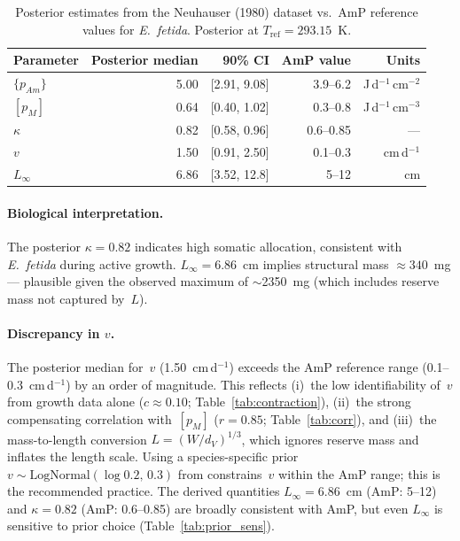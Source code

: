\documentclass[article,shortnames]{jss}
\newcommand{\pAm}{\{p_{Am}\}}
\newcommand{\pM}{[p_M]}
\begin{document}
\begin{table}[t!]
\centering
\caption{Posterior estimates from the Neuhauser (1980) dataset vs.\
  AmP reference values for \emph{E.~fetida}.  Posterior at
  $T_\mathrm{ref} = 293.15$~K.}
\label{tab:realdata}
\begin{tabular}{lrrrr}
\toprule
Parameter & Posterior median & 90\% CI & AmP value & Units \\
\midrule
$\pAm$     & 5.00 & [2.91, 9.08] & 3.9--6.2 &
  J\,d$^{-1}$\,cm$^{-2}$ \\
$\pM$      & 0.64 & [0.40, 1.02] & 0.3--0.8 &
  J\,d$^{-1}$\,cm$^{-3}$ \\
$\kappa$   & 0.82 & [0.58, 0.96] & 0.6--0.85 & --- \\
$v$        & 1.50 & [0.91, 2.50] & 0.1--0.3 & cm\,d$^{-1}$ \\
$L_\infty$ & 6.86 & [3.52, 12.8] & 5--12 & cm \\
\bottomrule
\end{tabular}
\end{table}

\paragraph{Biological interpretation.}
The posterior $\kappa = 0.82$ indicates high somatic allocation,
consistent with \emph{E.~fetida} during active growth.
$L_\infty = 6.86$~cm implies structural mass
$\approx 340$~mg --- plausible given the observed maximum of
$\sim$2350~mg (which includes reserve mass not captured by~$L$).

\paragraph{Discrepancy in $v$.}
The posterior median for~$v$ (1.50~cm\,d$^{-1}$) exceeds the AmP
reference range (0.1--0.3~cm\,d$^{-1}$) by an order of magnitude.
This reflects (i)~the low identifiability of~$v$ from growth data
alone ($c \approx 0.10$; Table~\ref{tab:contraction}), (ii)~the
strong compensating correlation with~$\pM$ ($r = 0.85$;
Table~\ref{tab:corr}), and (iii)~the mass-to-length conversion
$L = (W / d_V)^{1/3}$, which ignores reserve mass and inflates the
length scale.  Using a species-specific prior
$v \sim \mathrm{LogNormal}(\log 0.2,\, 0.3)$ from
 constrains~$v$ within
the AmP range; this is the recommended practice.
The derived quantities $L_\infty = 6.86$~cm (AmP:
5--12) and $\kappa = 0.82$ (AmP: 0.6--0.85) are broadly consistent
with AmP, but even $L_\infty$ is sensitive to prior choice
(Table~\ref{tab:prior_sens}).
\end{document}

